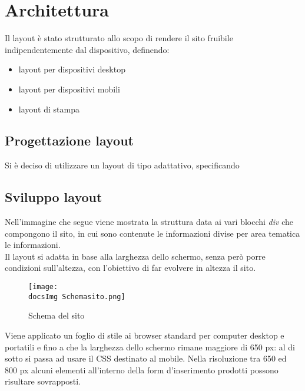 \section{Architettura}{
	Il layout è stato strutturato allo scopo di rendere il sito fruibile indipendentemente dal dispositivo, definendo:
	\begin{itemize}\itemsep1pt
		\item layout per dispositivi desktop
		\item layout per dispositivi mobili
		\item layout di stampa
	\end{itemize} 
	
	\subsection{Progettazione layout}{
		Si è deciso di utilizzare un layout di tipo adattativo, specificando 
	}
	\subsection{Sviluppo layout}{
		Nell'immagine che segue viene mostrata la struttura data ai vari blocchi \textit{div} che compongono il sito, in cui sono contenute le informazioni divise per area tematica le informazioni.
	\\
	Il layout si adatta in base alla larghezza dello schermo, senza però porre condizioni sull'altezza, con l'obiettivo di far evolvere in altezza il sito.
		\begin{figure}[H]
			\texttt{[image: \\docsImg Schemasito.png]}
			\caption{Schema del sito}
			\label{Schema del sito}
		\end{figure}
		
		Viene applicato un foglio di stile ai browser standard per computer desktop e portatili e fino a che la larghezza dello schermo rimane maggiore di 650 px: al di sotto si passa ad usare il CSS destinato al mobile.
		Nella risoluzione tra 650 ed 800 px alcuni elementi all'interno della form d'inserimento prodotti possono risultare sovrapposti.
		
}}
